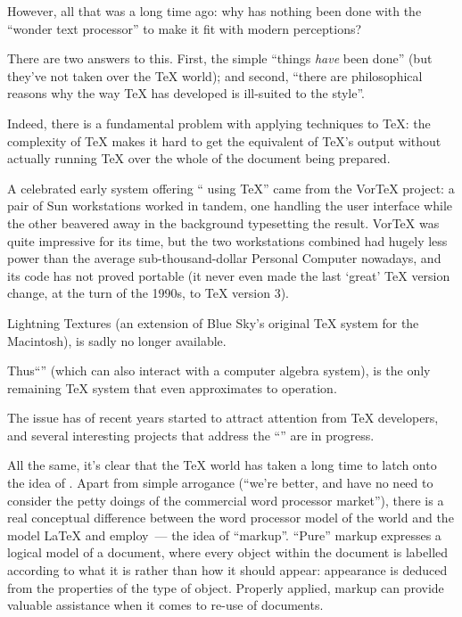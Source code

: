 However, all that was a long time ago: why has nothing been done with
the ``wonder text processor'' to make it fit with modern perceptions?

There are two answers to this.  First, the simple ``things \emph{have}
been done'' (but they've not taken over the \TeX{} world); and second,
``there are philosophical reasons why the way \TeX{} has developed is
ill-suited to the \WYSIWYG{} style''.

Indeed, there is a fundamental problem with applying \WYSIWYG{}
techniques to \TeX{}: the complexity of \TeX{} makes it hard to get
the equivalent of \TeX{}'s output without actually running \TeX{} over
the whole of the document being prepared.

A celebrated early system offering ``\WYSIWYG{} using \TeX{}'' came
from the Vor\TeX{} project: a pair of Sun workstations worked in
tandem, one handling the user interface while the other beavered away
in the background typesetting the result.  Vor\TeX{} was quite
impressive for its time, but the two workstations combined had hugely
less power than the average sub-thousand-dollar Personal Computer
nowadays, and its code has not proved portable (it never even made the
last `great' \TeX{} version change, at the turn of the 1990s, to
\TeX{} version 3).

Lightning Textures (an extension of Blue Sky's original \TeX{} system
for the Macintosh), is sadly no longer available.

Thus``'' (which can also interact
with a computer algebra system), is the only remaining \TeX{} system
that even approximates to \WYSIWYG{} operation.

The issue has of recent years started to attract attention
from \TeX{} developers, and several interesting projects that address
the ``''
are in progress.

All the same, it's clear that the \TeX{} world has taken a long time
to latch onto the idea of \WYSIWYG{}.
Apart from simple arrogance (``we're better, and have no need to
consider the petty doings of the commercial word processor market''),
there is a real conceptual difference between the word processor model
of the world and the model \LaTeX{} and \CONTeXT{} employ~--- the idea of
``markup''.  ``Pure'' markup expresses a logical model of a document,
where every object within the document is labelled according to what
it is rather than how it should appear: appearance is deduced from the
properties of the type of object.  Properly applied, markup can
provide valuable assistance when it comes to re-use of documents.

